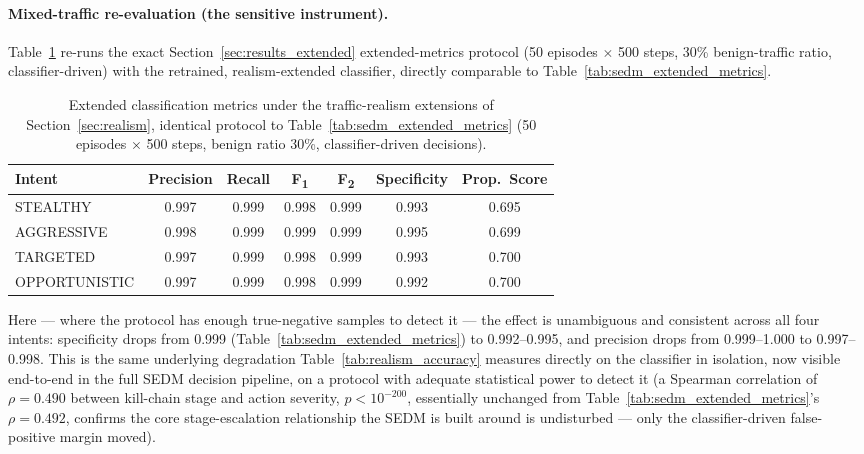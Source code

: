 \paragraph{Mixed-traffic re-evaluation (the sensitive instrument).}
Table~\ref{tab:realism_mixed_metrics} re-runs the exact
Section~\ref{sec:results_extended} extended-metrics protocol (50 episodes
$\times$ 500 steps, 30\% benign-traffic ratio, classifier-driven) with the
retrained, realism-extended classifier, directly comparable to
Table~\ref{tab:sedm_extended_metrics}.

\begin{table}[ht]
  \centering
  \caption{Extended classification metrics under the traffic-realism
           extensions of Section~\ref{sec:realism}, identical protocol to
           Table~\ref{tab:sedm_extended_metrics} (50 episodes $\times$ 500
           steps, benign ratio 30\%, classifier-driven decisions).}
  \label{tab:realism_mixed_metrics}
  \begin{tabular}{lcccccc}
    \toprule
    Intent & Precision & Recall & F\textsubscript{1} & F\textsubscript{2} & Specificity & Prop.\ Score \\
    \midrule
    STEALTHY      & 0.997 & 0.999 & 0.998 & 0.999 & 0.993 & 0.695 \\
    AGGRESSIVE    & 0.998 & 0.999 & 0.999 & 0.999 & 0.995 & 0.699 \\
    TARGETED      & 0.997 & 0.999 & 0.998 & 0.999 & 0.993 & 0.700 \\
    OPPORTUNISTIC & 0.997 & 0.999 & 0.998 & 0.999 & 0.992 & 0.700 \\
    \bottomrule
  \end{tabular}
\end{table}

Here — where the protocol has enough true-negative samples to detect it —
the effect is unambiguous and consistent across all four intents:
specificity drops from 0.999 (Table~\ref{tab:sedm_extended_metrics}) to
0.992--0.995, and precision drops from 0.999--1.000 to 0.997--0.998. This is
the same underlying degradation Table~\ref{tab:realism_accuracy} measures
directly on the classifier in isolation, now visible end-to-end in the full
SEDM decision pipeline, on a protocol with adequate statistical power to
detect it (a Spearman correlation of $\rho = 0.490$ between kill-chain stage
and action severity, $p < 10^{-200}$, essentially unchanged from
Table~\ref{tab:sedm_extended_metrics}'s $\rho = 0.492$, confirms the core
stage-escalation relationship the SEDM is built around is undisturbed —
only the classifier-driven false-positive margin moved).

